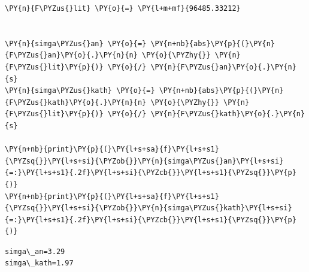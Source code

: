     \begin{tcolorbox}[breakable, size=fbox, boxrule=1pt, pad at break*=1mm,colback=cellbackground, colframe=cellborder]
\begin{Verbatim}[commandchars=\\\{\}]
\PY{n}{F\PYZus{}lit} \PY{o}{=} \PY{l+m+mf}{96485.33212}


\PY{n}{simga\PYZus{}an} \PY{o}{=} \PY{n+nb}{abs}\PY{p}{(}\PY{n}{F\PYZus{}an}\PY{o}{.}\PY{n}{n} \PY{o}{\PYZhy{}} \PY{n}{F\PYZus{}lit}\PY{p}{)} \PY{o}{/} \PY{n}{F\PYZus{}an}\PY{o}{.}\PY{n}{s}
\PY{n}{simga\PYZus{}kath} \PY{o}{=} \PY{n+nb}{abs}\PY{p}{(}\PY{n}{F\PYZus{}kath}\PY{o}{.}\PY{n}{n} \PY{o}{\PYZhy{}} \PY{n}{F\PYZus{}lit}\PY{p}{)} \PY{o}{/} \PY{n}{F\PYZus{}kath}\PY{o}{.}\PY{n}{s}

\PY{n+nb}{print}\PY{p}{(}\PY{l+s+sa}{f}\PY{l+s+s1}{\PYZsq{}}\PY{l+s+si}{\PYZob{}}\PY{n}{simga\PYZus{}an}\PY{l+s+si}{=:}\PY{l+s+s1}{.2f}\PY{l+s+si}{\PYZcb{}}\PY{l+s+s1}{\PYZsq{}}\PY{p}{)}
\PY{n+nb}{print}\PY{p}{(}\PY{l+s+sa}{f}\PY{l+s+s1}{\PYZsq{}}\PY{l+s+si}{\PYZob{}}\PY{n}{simga\PYZus{}kath}\PY{l+s+si}{=:}\PY{l+s+s1}{.2f}\PY{l+s+si}{\PYZcb{}}\PY{l+s+s1}{\PYZsq{}}\PY{p}{)}
\end{Verbatim}
\end{tcolorbox}

    \begin{Verbatim}[commandchars=\\\{\}]
simga\_an=3.29
simga\_kath=1.97
    \end{Verbatim}

